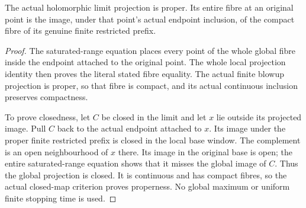 \begin{theorem}
\label{hir:actual-locally-finite-history-limit-proper}
\leanok
The actual holomorphic limit projection is proper. Its entire fibre at an
original point is the image, under that point's actual endpoint inclusion,
of the compact fibre of its genuine finite restricted prefix.
\end{theorem}
\begin{proof}
The saturated-range equation places every point of the whole global fibre
inside the endpoint attached to the original point. The whole local
projection identity then proves the literal stated fibre equality. The
actual finite blowup projection is proper, so that fibre is compact, and
its actual continuous inclusion preserves compactness.

To prove closedness, let $C$ be closed in the limit and let $x$ lie outside
its projected image. Pull $C$ back to the actual endpoint attached to $x$.
Its image under the proper finite restricted prefix is closed in the local
base window. The complement is an open neighbourhood of $x$ there. Its
image in the original base is open; the entire saturated-range equation
shows that it misses the global image of $C$. Thus the global projection is
closed. It is continuous and has compact fibres, so the actual closed-map
criterion proves properness. No global maximum or uniform finite stopping
time is used.
\end{proof}
